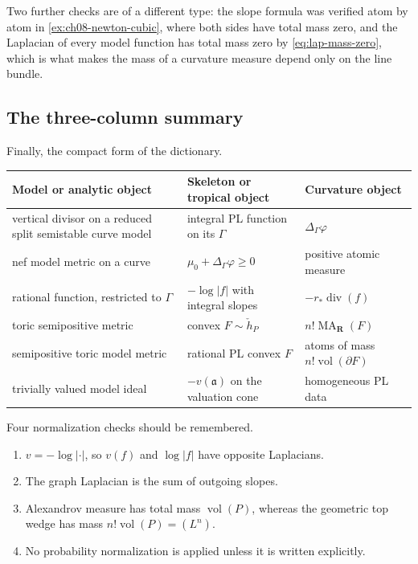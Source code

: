 Two further checks are of a different type: the slope formula was verified
atom by atom in \cref{ex:ch08-newton-cubic}, where both sides have total mass
zero, and the Laplacian of every model function has total mass zero by
\eqref{eq:lap-mass-zero}, which is what makes the mass of a curvature measure
depend only on the line bundle.

\subsection{The three-column summary}
\label{sec:ch08-dict-three-column}

Finally, the compact form of the dictionary.
\begin{center}
\small
\begin{tabular}{p{}|p{}|p{}}
\textbf{Model or analytic object}&\textbf{Skeleton or tropical object}
  &\textbf{Curvature object}\\ \hline
vertical divisor on a reduced split semistable curve model
  &integral PL function on its $\Gamma$
  &$\Delta_\Gamma\varphi$\\
nef model metric on a curve
  &$\mu_0+\Delta_\Gamma\varphi\geq0$
  &positive atomic measure\\
rational function, restricted to $\Gamma$
  &$-\log|f|$ with integral slopes
  &$-r_*\operatorname{div}(f)$\\
toric semipositive metric
  &convex $F\sim\check h_P$
  &$n!\operatorname{MA}_{\mathbf R}(F)$\\
semipositive toric model metric
  &rational PL convex $F$
  &atoms of mass $n!\operatorname{vol}(\partial F)$\\
trivially valued model ideal
  &$-v(\mathfrak a)$ on the valuation cone
  &homogeneous PL data
\end{tabular}
\end{center}

Four normalization checks should be remembered.
\begin{enumerate}
\item $v=-\log|\cdot|$, so $v(f)$ and $\log|f|$ have opposite Laplacians.
\item The graph Laplacian is the sum of outgoing slopes.
\item Alexandrov measure has total mass $\operatorname{vol}(P)$, whereas the
  geometric top wedge has mass $n!\operatorname{vol}(P)=(L^n)$.
\item No probability normalization is applied unless it is written
  explicitly.
\end{enumerate}


